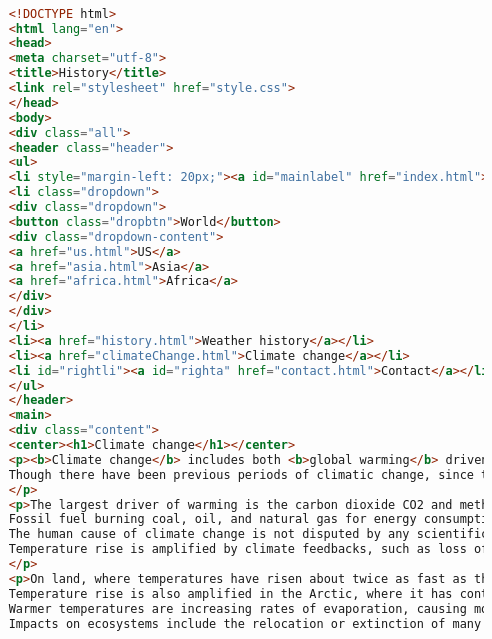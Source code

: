 \begin{lstlisting}[language=HTML,caption=Исходный код страницы Climate Change]

    <!DOCTYPE html>
    <html lang="en">
    <head>
    <meta charset="utf-8">
    <title>History</title>
    <link rel="stylesheet" href="style.css">
    </head>
    <body>
    <div class="all">
    <header class="header">
    <ul>
    <li style="margin-left: 20px;"><a id="mainlabel" href="index.html">Weather.org</a></li>
    <li class="dropdown">
    <div class="dropdown">
    <button class="dropbtn">World</button>
    <div class="dropdown-content">
    <a href="us.html">US</a>
    <a href="asia.html">Asia</a>
    <a href="africa.html">Africa</a>
    </div>
    </div>
    </li>
    <li><a href="history.html">Weather history</a></li>
    <li><a href="climateChange.html">Climate change</a></li>
    <li id="rightli"><a id="righta" href="contact.html">Contact</a></li>
    </ul>
    </header>
    <main>
    <div class="content">
    <center><h1>Climate change</h1></center>
    <p><b>Climate change</b> includes both <b>global warming</b> driven by human-induced emissions of greenhouse gases and the resulting large-scale shifts in weather patterns.
    Though there have been previous periods of climatic change, since the mid-20th century humans have had an unprecedented impact on Earth's climate system and caused change on a global scale.
    </p>
    <p>The largest driver of warming is the carbon dioxide CO2 and methane.
    Fossil fuel burning coal, oil, and natural gas for energy consumption is the main source of these emissions, with additional contributions from agriculture, deforestation, and the chemical reactions in certain manufacturing processes.
    The human cause of climate change is not disputed by any scientific body of national or international standing.
    Temperature rise is amplified by climate feedbacks, such as loss of sunlight-reflecting snow and ice cover, increased water vapoura greenhouse gas itself, and changes to land and ocean carbon sinks.
    </p>
    <p>On land, where temperatures have risen about twice as fast as the global average, deserts are expanding and heat waves and wildfires are becoming more common.
    Temperature rise is also amplified in the Arctic, where it has contributed to melting permafrost, glacial retreat and sea ice loss.
    Warmer temperatures are increasing rates of evaporation, causing more intense storms and weather extremes.
    Impacts on ecosystems include the relocation or extinction of many species as their environment changes, most immediately in coral reefs, mountains, and the Arctic.

\end{lstlisting}
